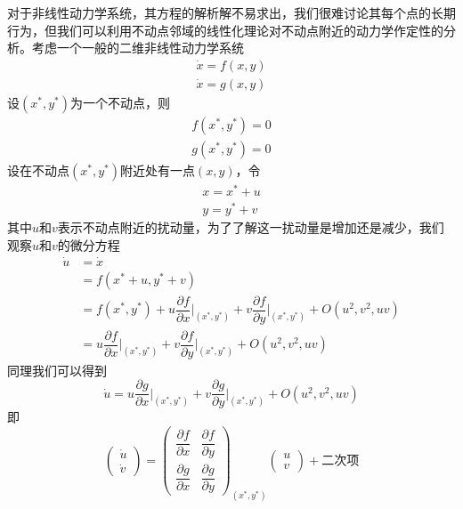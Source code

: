 对于非线性动力学系统，其方程的解析解不易求出，我们很难讨论其每个点的长期行为，但我们可以利用不动点邻域的线性化理论对不动点附近的动力学作定性的分析。考虑一个一般的二维非线性动力学系统
\begin{equation}
    \begin{aligned}
        \dot{x}=f(x,y)\\
        \dot{x}=g(x,y)
    \end{aligned}
\end{equation}
设$(x^*,y^*)$为一个不动点，则
\begin{equation}
    \begin{aligned}
        f(x^*,y^*)=0\\
        g(x^*,y^*)=0
    \end{aligned}
\end{equation}
设在不动点$(x^*,y^*)$附近处有一点$(x,y)$，令
\begin{equation}
    \begin{aligned}
        x=x^*+u\\
        y=y^*+v
    \end{aligned}
\end{equation}
其中$u$和$v$表示不动点附近的扰动量，为了了解这一扰动量是增加还是减少，我们观察$u$和$v$的微分方程
\begin{equation}
    \begin{aligned}
        \dot{u}&=\dot{x}\\
               &=f(x^*+u,y^*+v)\\
               &=f(x^*,y^*)+u\dfrac{\partial f}{\partial x}\Big|_{(x^*,y^*)}+v\dfrac{\partial f}{\partial y}\Big|_{(x^*,y^*)}+O(u^2,v^2,uv)\\
               &=u\dfrac{\partial f}{\partial x}\Big|_{(x^*,y^*)}+v\dfrac{\partial f}{\partial y}\Big|_{(x^*,y^*)}+O(u^2,v^2,uv)
    \end{aligned}
\end{equation}
同理我们可以得到
\begin{equation}
    \dot{u}=u\dfrac{\partial g}{\partial x}\Big|_{(x^*,y^*)}+v\dfrac{\partial g}{\partial y}\Big|_{(x^*,y^*)}+O(u^2,v^2,uv)
\end{equation}
即
\begin{equation}  
    \begin{pmatrix}
        \dot{u}\\
        \dot{v}
    \end{pmatrix}=
    \begin{pmatrix}
        \dfrac{\partial f}{\partial x} & \dfrac{\partial f}{\partial y} \\
        \dfrac{\partial g}{\partial x} & \dfrac{\partial g}{\partial y}
    \end{pmatrix}_{(x^*,y^*)}
    \begin{pmatrix}
        u\\v
    \end{pmatrix}+\text{二次项}
\end{equation}

